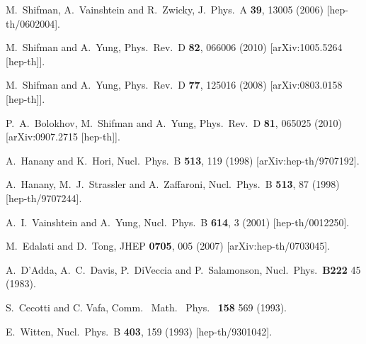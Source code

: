 \documentclass[12pt]{article}
\newcommand{\ntwo}{${\mathcal N}=2$}
\begin{document}
\begin{thebibliography}{99}
  
  M.~Shifman, A.~Vainshtein and R.~Zwicky,
  J.\ Phys.\ A {\bf 39}, 13005 (2006)
  [hep-th/0602004].

  
  M.~Shifman and A.~Yung,
  Phys.\ Rev.\ D {\bf 82}, 066006 (2010)
  [arXiv:1005.5264 [hep-th]].

  M.~Shifman and A.~Yung,
  Phys.\ Rev.\  D {\bf 77}, 125016 (2008)
  [arXiv:0803.0158 [hep-th]].

  P.~A.~Bolokhov, M.~Shifman and A.~Yung,
  Phys.\ Rev.\  D {\bf 81}, 065025 (2010)
  [arXiv:0907.2715 [hep-th]].
  
  
  A.~Hanany and K.~Hori,
  Nucl.\ Phys.\  B {\bf 513}, 119 (1998)
  [arXiv:hep-th/9707192].
  
  A.~Hanany, M.~J.~Strassler and A.~Zaffaroni,
  Nucl.\ Phys.\ B {\bf 513}, 87 (1998)
  [hep-th/9707244].

  A.~I.~Vainshtein and A.~Yung,
  Nucl.\ Phys.\ B {\bf 614}, 3 (2001)
  [hep-th/0012250].

  
  M.~Edalati and D.~Tong,
  JHEP {\bf 0705}, 005 (2007)
  [arXiv:hep-th/0703045].
  
  A.~D'Adda, A.~C.~Davis, P.~DiVeccia and P.~Salamonson,
  Nucl.\ Phys.\ {\bf B222} 45 (1983).
   
  S.~Cecotti and C. Vafa,
  Comm. \ Math. \ Phys. \ {\bf 158} 569 (1993).

  E.~Witten,
  Nucl.\ Phys.\ B {\bf 403}, 159 (1993)
  [hep-th/9301042].

  
\end{thebibliography}
\end{document}
